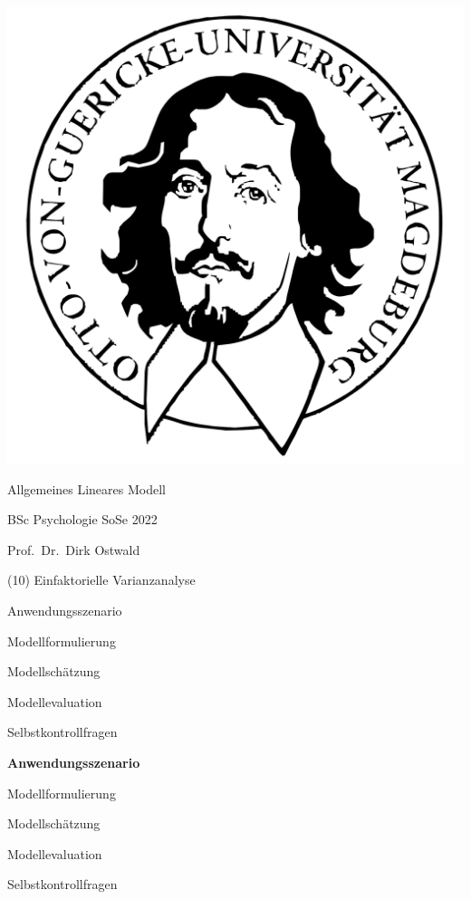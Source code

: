 \documentclass[
  8pt,
  ignorenonframetext,
]{beamer}
\author{}
\date{\vspace{-2.5em}}
\begin{document}
\begin{frame}[plain]{}
\protect\hypertarget{section}{}
\center

\begin{center}\includegraphics[width=0.2\linewidth]{10_Abbildungen/alm_10_otto} \end{center}

\vspace{2mm}

\huge

Allgemeines Lineares Modell \vspace{6mm}

\large

BSc Psychologie SoSe 2022

\vspace{6mm}
\normalsize

Prof.~Dr.~Dirk Ostwald
\end{frame}

\begin{frame}[plain]{}
\protect\hypertarget{section-1}{}
\center
\huge
\vfill

\noindent (10) Einfaktorielle Varianzanalyse \vfill
\end{frame}

\begin{frame}{}
\protect\hypertarget{section-2}{}
\large
{}
\vfill

Anwendungsszenario

Modellformulierung

Modellschätzung

Modellevaluation

Selbstkontrollfragen \vfill
\end{frame}

\begin{frame}{}
\protect\hypertarget{section-3}{}
\large
{}
\vfill

\textbf{Anwendungsszenario}

Modellformulierung

Modellschätzung

Modellevaluation

Selbstkontrollfragen \vfill
\end{frame}
\end{document}

